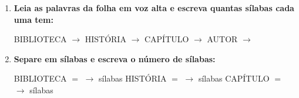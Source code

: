 \begin{exercicio}
\begin{enumerate}[resume]
  \item \textbf{Leia as palavras da folha em voz alta e escreva quantas sílabas cada uma tem:}

  \begin{center}
  BIBLIOTECA $\rightarrow$ \underline{\hspace{1cm}} \quad HISTÓRIA $\rightarrow$ \underline{\hspace{1cm}} \quad CAPÍTULO $\rightarrow$ \underline{\hspace{1cm}} \quad AUTOR $\rightarrow$ \underline{\hspace{1cm}}
  \end{center}

  \item \textbf{Separe em sílabas e escreva o número de sílabas:}
  \begin{center}
  BIBLIOTECA $=$ \underline{\hspace{1.2cm}} $\rightarrow$ \underline{\hspace{0.8cm}} sílabas \quad HISTÓRIA $=$ \underline{\hspace{1.2cm}} $\rightarrow$ \underline{\hspace{0.8cm}} sílabas \quad CAPÍTULO $=$ \underline{\hspace{1.2cm}} $\rightarrow$ \underline{\hspace{0.8cm}} sílabas
  \end{center}

\end{enumerate}

\end{exercicio}




